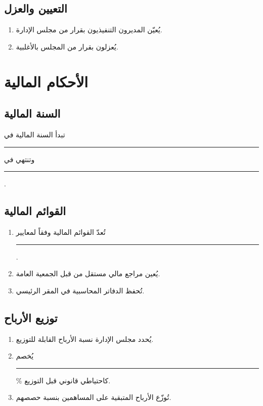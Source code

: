 \documentclass[12pt,a4paper]{article}
\begin{document}
\subsection{التعيين والعزل}
\begin{enumerate}
    \item يُعيّن المديرون التنفيذيون بقرار من مجلس الإدارة.
    \item يُعزلون بقرار من المجلس بالأغلبية.
\end{enumerate}

\section{الأحكام المالية}
\label{ch:finance}

\subsection{السنة المالية}
تبدأ السنة المالية في \rule{3cm}{0.4pt} وتنتهي في \rule{3cm}{0.4pt}.

\subsection{القوائم المالية}
\begin{enumerate}
    \item تُعدّ القوائم المالية وفقاً لمعايير \rule{4cm}{0.4pt}.
    \item يُعين مراجع مالي مستقل من قبل الجمعية العامة.
    \item تُحفظ الدفاتر المحاسبية في المقر الرئيسي.
\end{enumerate}

\subsection{توزيع الأرباح}
\begin{enumerate}
    \item يُحدد مجلس الإدارة نسبة الأرباح القابلة للتوزيع.
    \item يُخصم \rule{2cm}{0.4pt}\% كاحتياطي قانوني قبل التوزيع.
    \item تُوزّع الأرباح المتبقية على المساهمين بنسبة حصصهم.
\end{enumerate}

\end{document}
